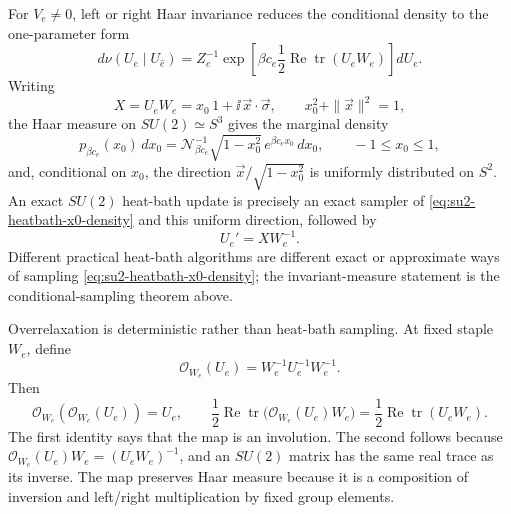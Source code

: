 For \(V_e\neq0\), left or right Haar invariance reduces the conditional
density to the one-parameter form
\begin{equation}
  d\nu(U_e\mid U_{\widehat e})
  =
  Z_e^{-1}
  \exp\!\left[
    \beta c_e\frac12\operatorname{Re}\operatorname{tr}(U_e W_e)
  \right]dU_e .
  \label{eq:su2-link-conditional}
\end{equation}
Writing
\[
  X=U_e W_e=x_0\,1+\ii\,\vec x\cdot\vec\sigma,
  \qquad
  x_0^2+\|\vec x\|^2=1,
\]
the Haar measure on \(SU(2)\simeq S^3\) gives the marginal density
\begin{equation}
  p_{\beta c_e}(x_0)\,dx_0
  =
  \mathcal N_{\beta c_e}^{-1}
  \sqrt{1-x_0^2}\,e^{\beta c_e x_0}\,dx_0,
  \qquad -1\leq x_0\leq1,
  \label{eq:su2-heatbath-x0-density}
\end{equation}
and, conditional on \(x_0\), the direction
\(\vec x/\sqrt{1-x_0^2}\) is uniformly distributed on \(S^2\).  An exact
\(SU(2)\) heat-bath update is precisely an exact sampler of
\eqref{eq:su2-heatbath-x0-density} and this uniform direction, followed by
\begin{equation}
  U_e'=X W_e^{-1}.
  \label{eq:su2-heatbath-reconstruction}
\end{equation}
Different practical heat-bath algorithms are different exact or approximate
ways of sampling \eqref{eq:su2-heatbath-x0-density}; the invariant-measure
statement is the conditional-sampling theorem above.

Overrelaxation is deterministic rather than heat-bath sampling.  At fixed
staple \(W_e\), define
\begin{equation}
  \mathcal O_{W_e}(U_e)
  =
  W_e^{-1}U_e^{-1}W_e^{-1}.
  \label{eq:su2-overrelaxation-map}
\end{equation}
Then
\begin{equation}
  \mathcal O_{W_e}(\mathcal O_{W_e}(U_e))=U_e,
  \qquad
  \frac12\operatorname{Re}\operatorname{tr}
  \bigl(\mathcal O_{W_e}(U_e)W_e\bigr)
  =
  \frac12\operatorname{Re}\operatorname{tr}(U_eW_e).
  \label{eq:su2-overrelaxation-involution-score}
\end{equation}
The first identity says that the map is an involution.  The second follows
because \(\mathcal O_{W_e}(U_e)W_e=(U_eW_e)^{-1}\), and an \(SU(2)\) matrix
has the same real trace as its inverse.  The map preserves Haar measure
because it is a composition of inversion and left/right multiplication by
fixed group elements.

